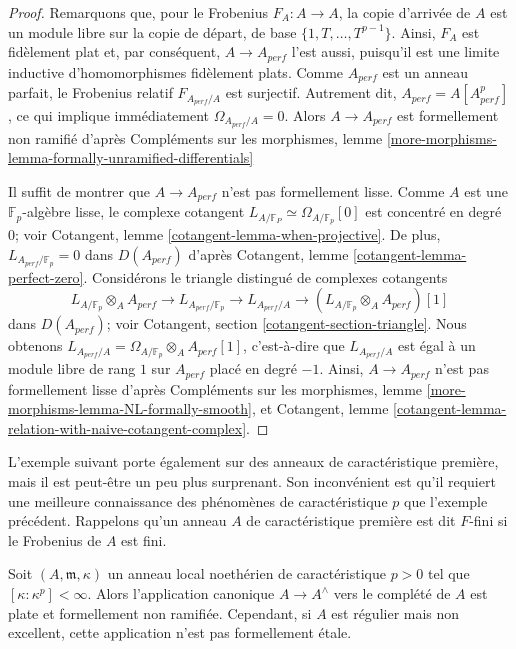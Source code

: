 \begin{proof}
Remarquons que, pour le Frobenius $F_A : A \to A$, la copie d'arrivée de $A$
est un module libre sur la copie de départ, de base $\{1, T, \dots, T^{p - 1}\}$.
Ainsi, $F_A$ est fidèlement plat et, par conséquent,
$A \to A_{perf}$ l'est aussi, puisqu'il est une limite inductive d'homomorphismes fidèlement plats.
Comme $A_{perf}$ est un anneau parfait, le Frobenius relatif
$F_{A_{perf}/A}$ est surjectif. Autrement dit,
$A_{perf} = A[A_{perf}^p]$, ce qui implique immédiatement
$\Omega_{A_{perf}/A} = 0$. Alors
$A \rightarrow A_{perf}$ est formellement non ramifié d'après
Compléments sur les morphismes, lemme
\ref{more-morphisms-lemma-formally-unramified-differentials}

\medskip\noindent
Il suffit de montrer que $A \rightarrow A_{perf}$
n'est pas formellement lisse. Comme $A$ est une
$\mathbb{F}_p$-algèbre lisse, le complexe cotangent
$L_{A/\mathbb{F}_P} \simeq \Omega_{A/\mathbb{F}_p}[0]$
est concentré en degré $0$; voir
Cotangent, lemme \ref{cotangent-lemma-when-projective}. De plus,
$L_{A_{perf}/\mathbb{F}_p} = 0$ dans $D(A_{perf})$
d'après Cotangent, lemme \ref{cotangent-lemma-perfect-zero}.
Considérons le triangle distingué de complexes cotangents
$$
L_{A/\mathbb{F}_p} \otimes_A A_{perf} \to
L_{A_{perf}/\mathbb{F}_p} \to
L_{A_{perf}/A} \to
(L_{A/\mathbb{F}_p} \otimes_A A_{perf})[1]
$$
dans $D(A_{perf})$; voir Cotangent, section \ref{cotangent-section-triangle}.
Nous obtenons $L_{A_{perf}/A} = \Omega_{A/\mathbb{F}_p} \otimes_A A_{perf}[1]$,
c'est-à-dire que $L_{A_{perf}/A}$ est égal à un module libre de rang $1$ sur $A_{perf}$
placé en degré $-1$. Ainsi, $A \rightarrow A_{perf}$
n'est pas formellement lisse d'après
Compléments sur les morphismes, lemme \ref{more-morphisms-lemma-NL-formally-smooth},
et
Cotangent, lemme \ref{cotangent-lemma-relation-with-naive-cotangent-complex}.
\end{proof}

\noindent
L'exemple suivant porte également sur des anneaux de caractéristique première, mais il est peut-être
un peu plus surprenant. Son inconvénient est qu'il requiert une meilleure connaissance des
phénomènes de caractéristique $p$ que l'exemple précédent. Rappelons qu'un
anneau $A$ de caractéristique première est dit $F$-fini si le Frobenius de $A$
est fini.

\begin{lemma}
\label{lemma-completion-etale}
Soit $(A, \mathfrak m, \kappa)$ un anneau local noethérien de caractéristique
$p > 0$ tel que $[\kappa : \kappa^p] < \infty$.
Alors l'application canonique $A \to A^\wedge$ vers le complété de $A$
est plate et formellement non ramifiée. Cependant, si $A$ est régulier mais non
excellent, cette application n'est pas formellement \'etale.
\end{lemma}

